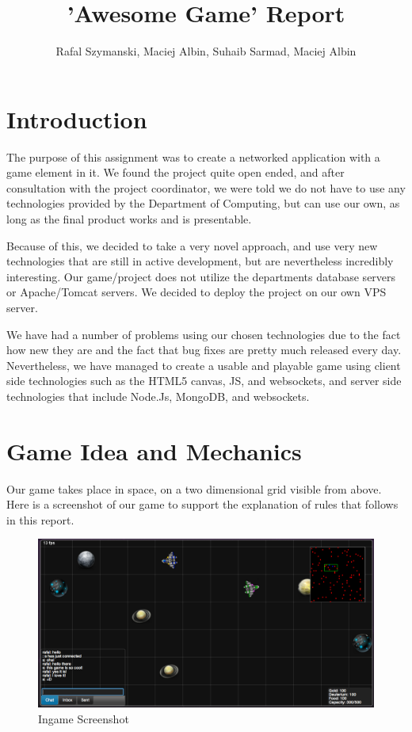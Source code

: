 \documentclass[a4paper,11pt]{article}
\title{'Awesome Game' Report}
\author{Rafal Szymanski, Maciej Albin, Suhaib Sarmad, Maciej Albin}
\begin{document}
 
	\maketitle
	
	\tableofcontents
	\newpage
	
	\section{Introduction}
	
		The purpose of this assignment was to create a networked application with a game element in it. We found the project quite open ended, and after consultation with the project coordinator, we were told we do not have to use any technologies provided by the Department of Computing, but can use our own, as long as the final product works and is presentable.

		Because of this, we decided to take a very novel approach, and use very new technologies that are still in active development, but are nevertheless incredibly interesting. Our game/project does not utilize the departments database servers or Apache/Tomcat servers. We decided to deploy the project on our own VPS server.

		We have had a number of problems using our chosen technologies due to the fact how new they are and the fact that bug fixes are pretty much released every day. Nevertheless, we have managed to create a usable and playable game using client side technologies such as the HTML5 canvas, JS, and websockets, and server side technologies that include Node.Js, MongoDB, and websockets.
	
		
	\section{Game Idea and Mechanics}
	
		Our game takes place in space, on a two dimensional grid visible from above. Here is a screenshot of our game to support the explanation of rules that follows in this report.
		
		\begin{figure}[htb]
		\begin{center}
		\leavevmode
		\includegraphics[scale=0.35]{screen1.png}
		\end{center}
		\caption{Ingame Screenshot}
		\label{fig:ingame1}
		\end{figure}
	
\end{document}
